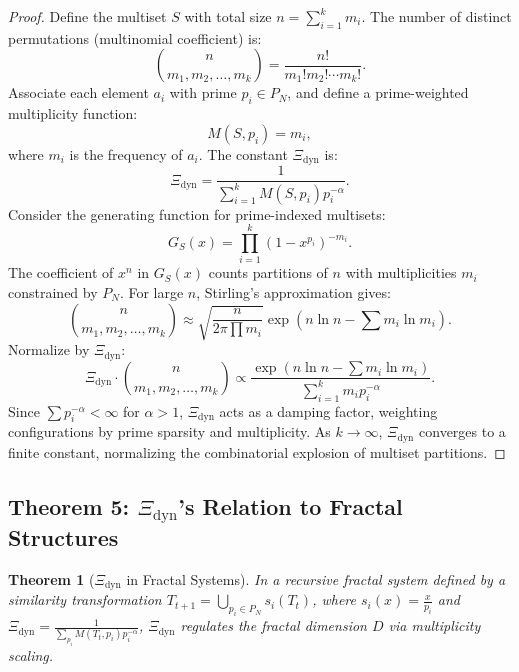 \documentclass{article}
\theoremstyle{plain}
\newtheorem{theorem}{Theorem}
\begin{document}
\begin{itemize}
\begin{proof}
Define the multiset \( S \) with total size \( n = \sum_{i=1}^k m_i \). The number of distinct permutations (multinomial coefficient) is:
\[
\binom{n}{m_1, m_2, \ldots, m_k} = \frac{n!}{m_1! m_2! \cdots m_k!}.
\]
Associate each element \( a_i \) with prime \( p_i \in P_N \), and define a prime-weighted multiplicity function:
\[
M(S, p_i) = m_i,
\]
where \( m_i \) is the frequency of \( a_i \). The constant $\Xi_{\text{dyn}}$ is:
\[
\Xi_{\text{dyn}} = \frac{1}{\sum_{i=1}^k M(S, p_i) p_i^{-\alpha}}.
\]
Consider the generating function for prime-indexed multisets:
\[
G_S(x) = \prod_{i=1}^k \left( 1 - x^{p_i} \right)^{-m_i}.
\]
The coefficient of \( x^n \) in \( G_S(x) \) counts partitions of \( n \) with multiplicities \( m_i \) constrained by \( P_N \). For large \( n \), Stirling’s approximation gives:
\[
\binom{n}{m_1, m_2, \ldots, m_k} \approx \sqrt{\frac{n}{2\pi \prod m_i}} \exp\left( n \ln n - \sum m_i \ln m_i \right).
\]
Normalize by $\Xi_{\text{dyn}}$:
\[
\Xi_{\text{dyn}} \cdot \binom{n}{m_1, m_2, \ldots, m_k} \propto \frac{\exp\left( n \ln n - \sum m_i \ln m_i \right)}{\sum_{i=1}^k m_i p_i^{-\alpha}}.
\]
Since \(\sum p_i^{-\alpha} < \infty\) for \(\alpha > 1\), $\Xi_{\text{dyn}}$ acts as a damping factor, weighting configurations by prime sparsity and multiplicity. As \( k \to \infty \), $\Xi_{\text{dyn}}$ converges to a finite constant, normalizing the combinatorial explosion of multiset partitions.
\end{proof}

\subsection{Theorem 5: $\Xi_{\text{dyn}}$'s Relation to Fractal Structures}
\begin{theorem}[$\Xi_{\text{dyn}}$ in Fractal Systems]
In a recursive fractal system defined by a similarity transformation \( T_{t+1} = \bigcup_{p_i \in P_N} s_i(T_t) \), where \( s_i(x) = \frac{x}{p_i} \) and $\Xi_{\text{dyn}} = \frac{1}{\sum_{p_i} M(T_t, p_i) p_i^{-\alpha}}$, $\Xi_{\text{dyn}}$ regulates the fractal dimension \( D \) via multiplicity scaling.
\end{theorem}


\end{itemize}
\end{document}
